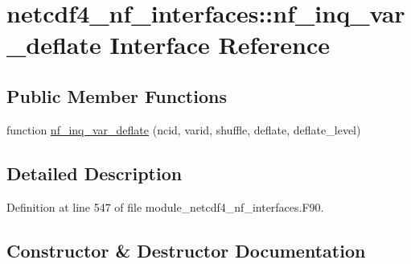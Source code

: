 \hypertarget{interfacenetcdf4__nf__interfaces_1_1nf__inq__var__deflate}{}\section{netcdf4\+\_\+nf\+\_\+interfaces\+:\+:nf\+\_\+inq\+\_\+var\+\_\+deflate Interface Reference}
\label{interfacenetcdf4__nf__interfaces_1_1nf__inq__var__deflate}
\subsection*{Public Member Functions}
\begin{DoxyCompactItemize}
\item 
function \hyperlink{interfacenetcdf4__nf__interfaces_1_1nf__inq__var__deflate_a335703dc013030d82ae11a653755b70c}{nf\+\_\+inq\+\_\+var\+\_\+deflate} (ncid, varid, shuffle, deflate, deflate\+\_\+level)
\end{DoxyCompactItemize}


\subsection{Detailed Description}


Definition at line 547 of file module\+\_\+netcdf4\+\_\+nf\+\_\+interfaces.\+F90.



\subsection{Constructor \& Destructor Documentation}
\mbox{\label{interfacenetcdf4__nf__interfaces_1_1nf__inq__var__deflate_a335703dc013030d82ae11a653755b70c}} 
